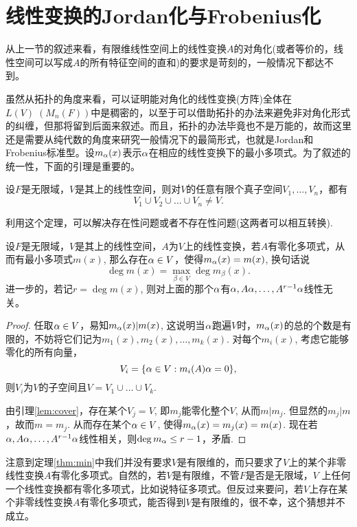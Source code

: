 \section{线性变换的Jordan化与Frobenius化}
从上一节的叙述来看，有限维线性空间上的线性变换$A$的对角化(或者等价的，线性空间可以写成$A$的所有特征空间的直和)的要求是苛刻的，一般情况下都达不到。

虽然从拓扑的角度来看，可以证明能对角化的线性变换(方阵)全体在$L(V)\;(M_n(F))$中是稠密的，以至于可以借助拓扑的办法来避免非对角化形式的纠缠，但那将留到后面来叙述。而且，拓扑的办法毕竟也不是万能的，故而这里还是需要从纯代数的角度来研究一般情况下的最简形式，也就是Jordan和Frobenius标准型。设$m_\alpha(x)$表示$\alpha$在相应的线性变换下的最小多项式。为了叙述的统一性，下面的引理是重要的。
\begin{lem}\label{lem:cover}
	设$F$是无限域，$V$是其上的线性空间，则对$V$的任意有限个真子空间$V_1,\dots,V_n$，都有
	\[V_1\cup V_2\cup \dots\cup V_n\neq V.\]
\end{lem}
利用这个定理，可以解决存在性问题或者不存在性问题(这两者可以相互转换).
\begin{thm}\label{thm:min}
	设$F$是无限域，$V$是其上的线性空间，$A$为$V$上的线性变换，若$A$有零化多项式，从而有最小多项式$m(x)$, 那么存在$\alpha\in V$，使得$m_\alpha (x)=m(x)$, 换句话说
	\[\deg m(x)=\max_{\beta\in V} \deg m_\beta(x).\]
	进一步的，若记$r=\deg m(x)$, 则对上面的那个$\alpha$有$\alpha,A\alpha,\dots,A^{r-1}\alpha$线性无关。
\end{thm}
\begin{proof}
	任取$\alpha\in V$，易知$m_\alpha(x)|m(x)$, 这说明当$\alpha$跑遍$V$时，$m_\alpha(x)$的总的个数是有限的，不妨将它们记为$m_1(x),m_2(x),\dots,m_k(x)$. 对每个$m_i(x)$, 考虑它能够零化的所有向量，
	\[V_i=\{\alpha\in V: m_i(A)\alpha=0\},\]
	则$V_i$为$V$的子空间且$V=V_1\cup \dots\cup V_k$. 

	由引理\ref{lem:cover}，存在某个$V_j=V$, 即$m_j$能零化整个$V$, 从而$m|m_j$. 但显然的$m_j|m$，故而$m=m_j$. 从而存在某个$\alpha\in V$, 使得$m_\alpha(x)=m_j(x)=m(x)$. 现在若$\alpha,A\alpha,\dots,A^{r-1}\alpha$线性相关，则$\deg m_\alpha\leq r-1$，矛盾.
\end{proof}
注意到定理\ref{thm:min}中我们并没有要求$V$是有限维的，而只要求了$V$上的某个非零线性变换$A$有零化多项式。自然的，若$V$是有限维，不管$F$是否是无限域，$V$
上任何一个线性变换都有零化多项式，比如说特征多项式。但反过来要问，若$V$上存在某个非零线性变换$A$有零化多项式，能否得到$V$是有限维的，很不幸，这个猜想并不成立。

